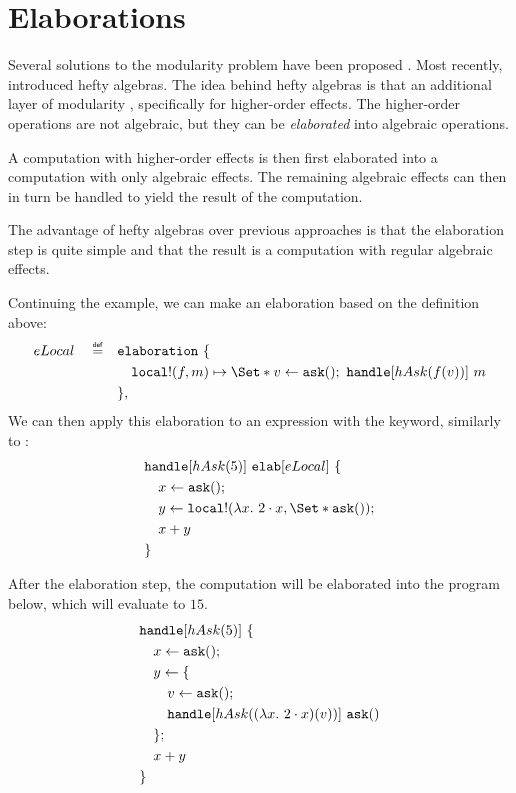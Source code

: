 \section{Elaborations}\label{sec:elab}

Several solutions to the modularity problem have been proposed \autocite{wu_effect_2014, oh_latent_2021}. Most recently, \textcite{bach_poulsen_hefty_2023} introduced hefty algebras. The idea behind hefty algebras is that an additional layer of modularity , specifically for higher-order effects. The higher-order operations are not algebraic, but they can be \emph{elaborated} into algebraic operations.

A computation with higher-order effects is then first elaborated into a computation with only algebraic effects. The remaining algebraic effects can then in turn be handled to yield the result of the computation.

The advantage of hefty algebras over previous approaches is that the elaboration step is quite simple and that the result is a computation with regular algebraic effects.

Continuing the \olocal example, we can make an elaboration based on the definition above:
\begin{align*}
    eLocal \quad\defeq\quad
        &\elaboration\ \{ \\
        &\quad\olocal!(f, m) \mapsto \S{v \gets \oask()\seq \handle[hAsk(f(v))]\ m }\\
        &\},
\end{align*}
We can then apply this elaboration to an expression with the \elab keyword, similarly to \handle:
\begin{align*}
    &\handle[hAsk(5)]\ \elab[eLocal]\ \{ \\
    &\quad x \gets \oask();\\
    &\quad y \gets \olocal!(\lambda x.\ 2\cdot x, \S{ \oask() });\\
    &\quad x + y \\
    &\}
\end{align*}

After the elaboration step, the computation will be elaborated into the program below, which will evaluate to $15$.
\begin{align*}
    &\text{\texttt{handle}}[hAsk(5)]\ \{ \\
    &\quad x \gets \mathtt{ask}();\\
    &\quad y \gets \{\\
    &\quad\quad v \gets \mathtt{ask}();\\
    &\quad\quad \text{\texttt{handle}}[hAsk((\lambda x.\ 2\cdot x)(v))]\ \mathtt{ask}()\\
    &\quad\};\\
    &\quad x + y \\
    &\}
\end{align*}

